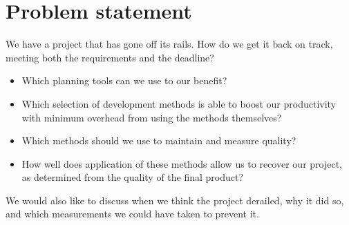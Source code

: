 \section{Problem statement}
We have a project that has gone off its rails. How do we get it back on track, meeting both the requirements and the deadline?
\begin{itemize}
\item Which planning tools can we use to our benefit?
\item Which selection of development methods is able to boost our productivity with minimum overhead from using the methods themselves?
\item Which methods should we use to maintain and measure quality?
\item How well does application of these methods allow us to recover our project, as determined from the quality of the final product?
\end{itemize}
We would also like to discuss when we think the project derailed, why it did so, and which measurements we could have taken to prevent it.
\newpage